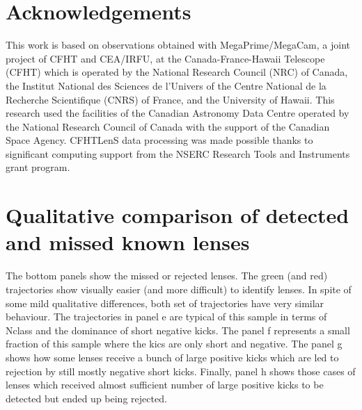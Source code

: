 \documentclass[useAMS,usenatbib,a4paper]{mn2e}
\begin{document}
\twocolumn
\section*{Acknowledgements}


This work is based on observations obtained with MegaPrime/MegaCam, a joint
project of CFHT and CEA/IRFU, at the Canada-France-Hawaii Telescope (CFHT) which
is operated by the National Research Council (NRC) of Canada, the Institut
National des Sciences de l'Univers of the Centre National de la Recherche
Scientifique (CNRS) of France, and the University of Hawaii. This research used
the facilities of the Canadian Astronomy Data Centre operated by the National
Research Council of Canada with the support of the Canadian Space Agency.
CFHTLenS data processing was made possible thanks to significant computing
support from the NSERC Research Tools and Instruments grant program.


\appendix

\section{Qualitative comparison of detected and missed known lenses}
\label{appendix:traj}

The bottom panels show the missed or rejected lenses. The green (and red)
trajectories show visually easier (and more difficult) to identify
lenses. In spite of some mild qualitative differences, both set of
trajectories have very similar behaviour. The trajectories in panel e
are typical of this sample in terms of Nclass and the dominance of short
negative kicks. The panel f represents a small fraction of this sample
where the kics are only short and negative. The panel g shows how some
lenses receive a bunch of large positive kicks which are led to
rejection by still mostly negative short kicks. Finally, panel h shows
those cases of lenses which received almost sufficient number of large
positive kicks to be detected but ended up being rejected.
\end{document}
